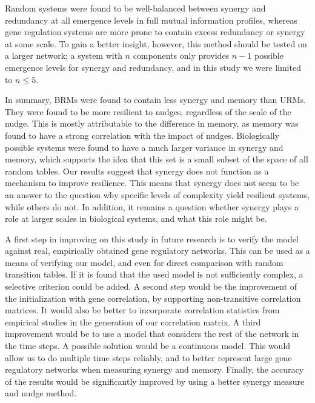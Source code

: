 \documentclass[../main.tex]{subfiles}
\begin{document}
Random systems were found to be well-balanced between synergy and redundancy at all emergence levels in full mutual information profiles, whereas gene regulation systems are more prone to contain excess redundancy or synergy at some scale.
To gain a better insight, however, this method should be tested on a larger network; a system with $n$ components only provides $n-1$ possible emergence levels for synergy and redundancy, and in this study we were limited to $n \le 5$.

In summary, BRMs were found to contain less synergy and memory than URMs.
They were found to be more resilient to nudges, regardless of the scale of the nudge.
This is mostly attributable to the difference in memory, as memory was found to have a strong correlation with the impact of nudges.
Biologically possible systems were found to have a much larger variance in synergy and memory, which supports the idea that this set is a small subset of the space of all random tables.
Our results suggest that synergy does not function as a mechanism to improve resilience.
This means that synergy does not seem to be an answer to the question why specific levels of complexity yield resilient systems, while others do not.
In addition, it remains a question whether synergy plays a role at larger scales in biological systems, and what this role might be.

A first step in improving on this study in future research is to verify the model against real, empirically obtained gene regulatory networks.
This can be used as a means of verifying our model, and even for direct comparison with random transition tables.
If it is found that the used model is not sufficiently complex, a selective criterion could be added.
A second step would be the improvement of the initialization with gene correlation, by supporting non-transitive correlation matrices.
It would also be better to incorporate correlation statistics from empirical studies in the generation of our correlation matrix.
A third improvement would be to use a model that considers the rest of the network in the time steps.
A possible solution would be a continuous model.
This would allow us to do multiple time steps reliably, and to better represent large gene regulatory networks when measuring synergy and memory. %
Finally, the accuracy of the results would be significantly improved by using a better synergy measure and nudge method.
\end{document}
